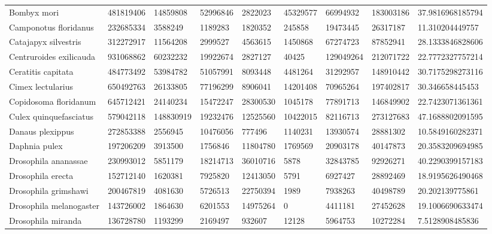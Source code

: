 \begin{table}[]
\begin{tabular}{@{}lllllllll@{}}
Bombyx mori                & 481819406   & 14859808  & 52996846  & 2822023   & 45329577  & 66994932   & 183003186  & 37.9816968185794  \\
Camponotus floridanus      & 232685334   & 3588249   & 1189283   & 1820352   & 245858    & 19473445   & 26317187   & 11.310204449757   \\
Catajapyx silvestris       & 312272917   & 11564208  & 2999527   & 4563615   & 1450868   & 67274723   & 87852941   & 28.1333846828606  \\
Centruroides exilicauda    & 931068862   & 60232232  & 19922674  & 2827127   & 40425     & 129049264  & 212071722  & 22.7772327757214  \\
Ceratitis capitata         & 484773492   & 53984782  & 51057991  & 8093448   & 4481264   & 31292957   & 148910442  & 30.7175298273116  \\
Cimex lectularius          & 650492763   & 26133805  & 77196299  & 8906041   & 14201408  & 70965264   & 197402817  & 30.346658445453   \\
Copidosoma floridanum      & 645712421   & 24140234  & 15472247  & 28300530  & 1045178   & 77891713   & 146849902  & 22.7423071361361  \\
Culex quinquefasciatus     & 579042118   & 148830919 & 19232476  & 12525560  & 10422015  & 82116713   & 273127683  & 47.1688802091595  \\
Danaus plexippus           & 272853388   & 2556945   & 10476056  & 777496    & 1140231   & 13930574   & 28881302   & 10.5849160282371  \\
Daphnia pulex              & 197206209   & 3913500   & 1756846   & 11804780  & 1769569   & 20903178   & 40147873   & 20.3583209694985  \\
Drosophila ananassae       & 230993012   & 5851179   & 18214713  & 36010716  & 5878      & 32843785   & 92926271   & 40.2290399157183  \\
Drosophila erecta          & 152712140   & 1620381   & 7925820   & 12413050  & 5791      & 6927427    & 28892469   & 18.9195626490468  \\
Drosophila grimshawi       & 200467819   & 4081630   & 5726513   & 22750394  & 1989      & 7938263    & 40498789   & 20.202139775861   \\
Drosophila melanogaster    & 143726002   & 1864630   & 6201553   & 14975264  & 0         & 4411181    & 27452628   & 19.1006690633474  \\
Drosophila miranda         & 136728780   & 1193299   & 2169497   & 932607    & 12128     & 5964753    & 10272284   & 7.5128908485836   \\

\end{tabular}
\end{table}
